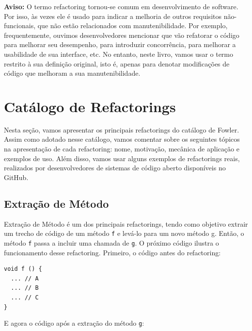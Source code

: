 \documentclass[
  11pt,
  twoside]{book}
\newcommand{\passthrough}[1]{#1}
\newenvironment{aviso}{\centering \vspace{1.5ex} \begin{tcolorbox}[breakable, colback=backcolor, width=4.9in]}{\end{tcolorbox} \vspace{1.5ex}}
\begin{document}
\begin{aviso}

\textbf{Aviso:} O termo refactoring tornou-se comum em desenvolvimento
de software. Por isso, às vezes ele é usado para indicar a melhoria de
outros requisitos não-funcionais, que não estão relacionados com
manutenibilidade. Por exemplo, frequentemente, ouvimos desenvolvedores
mencionar que vão refatorar o código para melhorar seu desempenho, para
introduzir concorrência, para melhorar a usabilidade de sua interface,
etc. No entanto, neste livro, vamos usar o termo restrito à sua
definição original, isto é, apenas para denotar modificações de código
que melhoram a sua manutenibilidade.

\end{aviso}

\hypertarget{catuxe1logo-de-refactorings}{%
\section{Catálogo de Refactorings}\label{catuxe1logo-de-refactorings}}

Nesta seção, vamos apresentar os principais refactorings do catálogo de
Fowler. Assim como adotado nesse catálogo, vamos comentar sobre os
seguintes tópicos na apresentação de cada refactoring: nome, motivação,
mecânica de aplicação e exemplos de uso. Além disso, vamos usar alguns
exemplos de refactorings reais, realizados por desenvolvedores de
sistemas de código aberto disponíveis no GitHub.

\hypertarget{extrauxe7uxe3o-de-muxe9todo}{%
\subsection{Extração de Método}\label{extrauxe7uxe3o-de-muxe9todo}}


Extração de Método é um dos principais refactorings, tendo como objetivo
extrair um trecho de código de um método \passthrough{\lstinline!f!} e
levá-lo para um novo método g. Então, o método
\passthrough{\lstinline!f!} passa a incluir uma chamada de
\passthrough{\lstinline!g!}. O próximo código ilustra o funcionamento
desse refactoring. Primeiro, o código antes do refactoring:

\begin{lstlisting}
void f () {
  ... // A
  ... // B 
  ... // C
}
\end{lstlisting}

E agora o código após a extração do método \passthrough{\lstinline!g!}:
\end{document}
